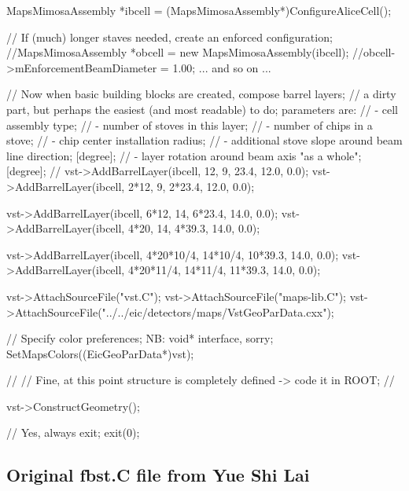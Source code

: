 \documentclass[12pt]{article}
\begin{document}
\begin{tcolorbox}
\begin{verbnobox}[\tiny]
{  MapsMimosaAssembly *ibcell = (MapsMimosaAssembly*)ConfigureAliceCell();

  // If (much) longer staves needed, create an enforced configuration;
  //MapsMimosaAssembly *obcell = new MapsMimosaAssembly(ibcell);
  //obcell->mEnforcementBeamDiameter     =    1.00; ... and so on ...

  // Now when basic building blocks are created, compose barrel layers;
  // a dirty part, but perhaps the easiest (and most readable) to do; parameters are:
  //  - cell assembly type;
  //  - number of stoves in this layer;
  //  - number of chips in a stove;
  //  - chip center installation radius;
  //  - additional stove slope around beam line direction; [degree];
  //  - layer rotation around beam axis "as a whole"; [degree];
  //
  vst->AddBarrelLayer(ibcell,   12,  9,   23.4, 12.0, 0.0);
  vst->AddBarrelLayer(ibcell, 2*12,  9, 2*23.4, 12.0, 0.0);

  vst->AddBarrelLayer(ibcell, 6*12, 14, 6*23.4, 14.0, 0.0);
  vst->AddBarrelLayer(ibcell, 4*20, 14, 4*39.3, 14.0, 0.0);

  vst->AddBarrelLayer(ibcell, 4*20*10/4, 14*10/4, 10*39.3, 14.0, 0.0);
  vst->AddBarrelLayer(ibcell, 4*20*11/4, 14*11/4, 11*39.3, 14.0, 0.0);

  vst->AttachSourceFile("vst.C");
  vst->AttachSourceFile("maps-lib.C");
  vst->AttachSourceFile("../../eic/detectors/maps/VstGeoParData.cxx");

  // Specify color preferences; NB: void* interface, sorry;
  SetMapsColors((EicGeoParData*)vst);

  //
  // Fine, at this point structure is completely defined -> code it in ROOT;
  //

  vst->ConstructGeometry();

  // Yes, always exit;
  exit(0);
}
\end{verbnobox}  
\end{tcolorbox}

\pagebreak
\subsection{Original fbst.C file from Yue Shi Lai}
\end{document}
